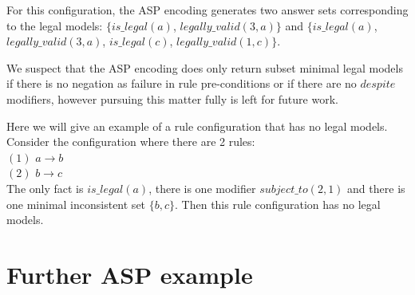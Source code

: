 For this configuration, the ASP encoding generates two answer sets corresponding to the legal models:
\newline
$\{is\_legal(a)$, $legally\_valid(3,a)\}$ and $\{is\_legal(a)$, $legally\_valid(3,a)$, $is\_legal(c)$, $legally\_valid(1,c)\}$.

We suspect that the ASP encoding does only return subset minimal legal models if there is no negation as failure in rule pre-conditions or if there are no $despite$ modifiers, however pursuing this matter fully is left for future work.

Here we will give an example of a rule configuration that has no legal models.
Consider the configuration where there are 2 rules:\\ $(1)$ $a\rightarrow b$\\
$(2)$ $b\rightarrow c$\\
The only fact is $is\_legal(a)$, there is one modifier $subject\_to(2,1)$ and there is one minimal inconsistent set $\{b,c\}$. Then this rule configuration has no legal models. 

\section{Further ASP example}

